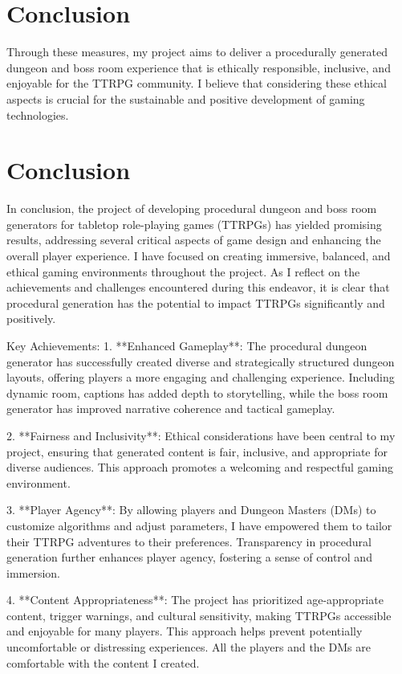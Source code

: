 \documentclass[10pt,twocolumn]{article}
\begin{document}
\section{Conclusion}
Through these measures, my project aims to deliver a procedurally generated dungeon and boss room experience that is ethically responsible, inclusive, and enjoyable for the TTRPG community. I believe that considering these ethical aspects is crucial for the sustainable and positive development of gaming technologies.


\section{Conclusion}

In conclusion, the project of developing procedural dungeon and boss room generators for tabletop role-playing games (TTRPGs) has yielded promising results, addressing several critical aspects of game design and enhancing the overall player experience. I have focused on creating immersive, balanced, and ethical gaming environments throughout the project. As I reflect on the achievements and challenges encountered during this endeavor, it is clear that procedural generation has the potential to impact TTRPGs significantly and positively.

Key Achievements:
1. **Enhanced Gameplay**: The procedural dungeon generator has successfully created diverse and strategically structured dungeon layouts, offering players a more engaging and challenging experience. Including dynamic room, captions has added depth to storytelling, while the boss room generator has improved narrative coherence and tactical gameplay.

2. **Fairness and Inclusivity**: Ethical considerations have been central to my project, ensuring that generated content is fair, inclusive, and appropriate for diverse audiences. This approach promotes a welcoming and respectful gaming environment.

3. **Player Agency**: By allowing players and Dungeon Masters (DMs) to customize algorithms and adjust parameters,  I have empowered them to tailor their TTRPG adventures to their preferences. Transparency in procedural generation further enhances player agency, fostering a sense of control and immersion.

4. **Content Appropriateness**: The project has prioritized age-appropriate content, trigger warnings, and cultural sensitivity, making TTRPGs accessible and enjoyable for many players. This approach helps prevent potentially uncomfortable or distressing experiences. All the players and the DMs are comfortable with the content I created.
\end{document}
